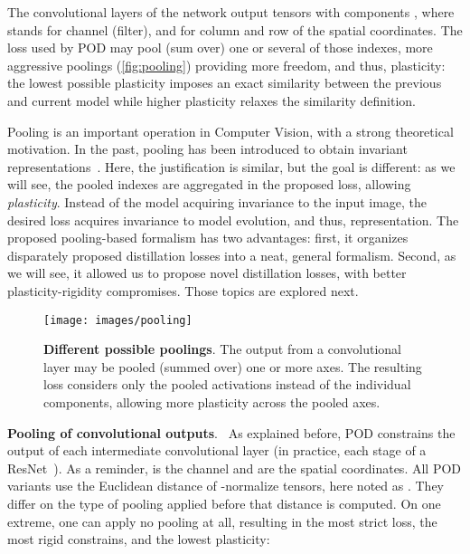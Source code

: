 \documentclass[runningheads]{llncs}
\newcommand{\parag}[1]{\vspace{0.2cm}\noindent\textbf{#1}.\ }
\begin{document}
The convolutional layers of the network output tensors  with components , where  stands for channel (filter), and  for column and row of the spatial coordinates. The loss used by POD may pool (sum over) one or several of those indexes, more aggressive poolings (\autoref{fig:pooling}) providing more freedom, and thus, plasticity: the lowest possible plasticity imposes an exact similarity between the previous and current model while higher plasticity relaxes the similarity definition.

Pooling is an important operation in Computer Vision, with a strong theoretical motivation. In the past, pooling has been introduced to obtain invariant representations~\cite{lowe1999sift,lazbnik2006spatial_pyramid_matching}. Here, the justification is similar, but the goal is different: as we will see, the pooled indexes are aggregated in the proposed loss, allowing \textit{plasticity}. Instead of the model acquiring invariance to the input image, the desired loss acquires invariance to model evolution, and thus, representation.
The proposed pooling-based formalism has two advantages: first, it organizes disparately proposed distillation losses into a neat, general formalism. Second, as we will see, it allowed us to propose novel distillation losses, with better plasticity-rigidity compromises. Those topics are explored next.

\begin{figure}[tb]
\begin{center}
    \texttt{[image: images/pooling]}
\end{center}
   \caption{\textbf{Different possible poolings}. The output from a convolutional layer  may be pooled (summed over) one or more axes. The resulting loss considers only the pooled activations instead of the individual components, allowing more plasticity across the pooled axes.}
    \label{fig:pooling}
\end{figure}

\parag{Pooling of convolutional outputs} As explained before, POD constrains the output of each intermediate convolutional layer  (in practice, each stage of a ResNet~\cite{he2016resnet}). As a reminder,  is the channel and  are the spatial coordinates. All POD variants use the Euclidean distance of -normalize tensors, here noted as . They differ on the type of pooling applied before that distance is computed.
On one extreme, one can apply no pooling at all, resulting in the most strict loss, the most rigid constrains, and the lowest plasticity:
\end{document}
